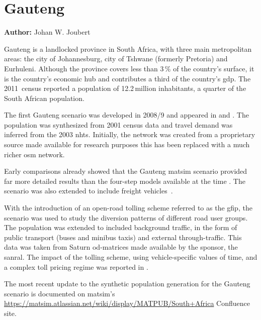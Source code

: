 \section{Gauteng}
\label{sec:gauteng}
\hfill \textbf{Author:} Johan W. Joubert


Gauteng is a landlocked province in South Africa, with  three main metropolitan areas: the city of Johannesburg, city of Tshwane (formerly Pretoria) and Eurhuleni. Although the province covers less than 3\,\% of the country's surface, it is the country's economic hub and contributes a third of the country's \gls{gdp}. The 2011~census reported a population of 12.2\,million inhabitants, a quarter of the South African population. 

The first Gauteng scenario was developed in 2008/9 and appeared in \citet[][]{Fourie2009MastersThesis} and \citet[][]{FourieJoubert_SATC_2009}. The population was synthesized from 2001 census data and travel demand was inferred from the 2003 \gls{nhts}. Initially, the network was created from a proprietary source made available for research purposes this has been replaced with a much richer \gls{osm} network.

Early comparisons already showed that the Gauteng \gls{matsim} scenario provided far more detailed results than the four-step models available at the time \citep[][]{Fourie_SATC_2010}. The scenario was also extended to include freight vehicles~\citep[][]{JoubertJEtAl_TRR_2010}.

With the introduction of an open-road tolling scheme referred to as the \gls{gfip}, the scenario was used to study the diversion patterns of different road user groups. The population was extended to included background traffic, in the form of public transport (buses and minibus taxis) and external through-traffic. This data was taken from Saturn \gls{od}-matrices made available by the sponsor, the \gls{sanral}. The impact of the tolling scheme, using vehicle-specific values of time, and a complex toll pricing regime was reported in \citet[][]{NagelKickhoeferJoubert2014HeterogeneousVoTsPROCEDIA}.

The most recent update to the synthetic population generation for the Gauteng scenario is documented on \gls{matsim}'s \url{https://matsim.atlassian.net/wiki/display/MATPUB/South+Africa} Confluence site.

